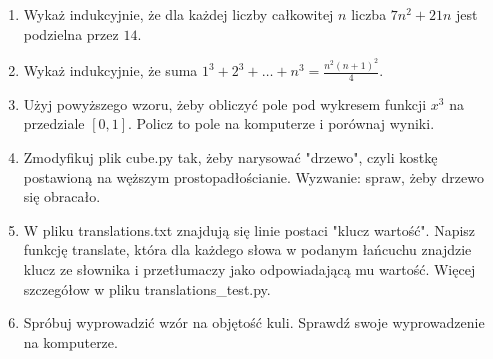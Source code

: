 \documentclass{article}
\begin{document}
    \begin{enumerate}
        \item Wykaż indukcyjnie, że dla każdej liczby całkowitej $n$ liczba $7n^2 + 21n$ jest podzielna przez $14$.
        \item Wykaż indukcyjnie, że suma $1^3 + 2^3 + \dots + n^3 = \frac{n^2(n+1)^2}{4}$.
        \item Użyj powyższego wzoru, żeby obliczyć pole pod wykresem funkcji $x^3$ na przedziale $[0, 1]$. Policz to pole na komputerze i porównaj wyniki.
        \item Zmodyfikuj plik cube.py tak, żeby narysować "drzewo", czyli kostkę postawioną na węższym prostopadłościanie. Wyzwanie: spraw, żeby drzewo się obracało.
        \item W pliku translations.txt znajdują się linie postaci "klucz wartość". Napisz funkcję translate, która dla każdego słowa w podanym łańcuchu znajdzie klucz ze słownika i przetłumaczy jako odpowiadającą mu wartość. Więcej szczegółow w pliku translations\_test.py.
        \item Spróbuj wyprowadzić wzór na objętość kuli. Sprawdź swoje wyprowadzenie na komputerze.
    \end{enumerate}
\end{document}

